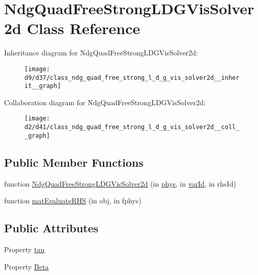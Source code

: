 \hypertarget{class_ndg_quad_free_strong_l_d_g_vis_solver2d}{}\section{Ndg\+Quad\+Free\+Strong\+L\+D\+G\+Vis\+Solver2d Class Reference}
\label{class_ndg_quad_free_strong_l_d_g_vis_solver2d}


Inheritance diagram for Ndg\+Quad\+Free\+Strong\+L\+D\+G\+Vis\+Solver2d\+:
\nopagebreak
\begin{figure}[H]
\begin{center}
\leavevmode
\texttt{[image: d9/d37/class\_ndg\_quad\_free\_strong\_l\_d\_g\_vis\_solver2d\_\_inherit\_\_graph]}
\end{center}
\end{figure}


Collaboration diagram for Ndg\+Quad\+Free\+Strong\+L\+D\+G\+Vis\+Solver2d\+:
\nopagebreak
\begin{figure}[H]
\begin{center}
\leavevmode
\texttt{[image: d2/d41/class\_ndg\_quad\_free\_strong\_l\_d\_g\_vis\_solver2d\_\_coll\_\_graph]}
\end{center}
\end{figure}
\subsection*{Public Member Functions}
\begin{DoxyCompactItemize}
\item 
function \hyperlink{class_ndg_quad_free_strong_l_d_g_vis_solver2d_a495a34183b55abf7f1485f0d4c964ce8}{Ndg\+Quad\+Free\+Strong\+L\+D\+G\+Vis\+Solver2d} (in \hyperlink{class_ndg_abstract_vis_solver_a47663b482747f4136520112484ee2fcd}{phys}, in \hyperlink{class_ndg_abstract_vis_solver_ae28ac2785a59d4c1d8b59e578150a50b}{var\+Id}, in rhs\+Id)
\item 
function \hyperlink{class_ndg_quad_free_strong_l_d_g_vis_solver2d_a830dff480b3f9767f1d655de31578641}{mat\+Evaluate\+R\+HS} (in obj, in fphys)
\end{DoxyCompactItemize}
\subsection*{Public Attributes}
\begin{DoxyCompactItemize}
\item 
Property \hyperlink{class_ndg_quad_free_strong_l_d_g_vis_solver2d_a7359d5677096d6334872b132ac0d5a46}{tau}
\item 
Property \hyperlink{class_ndg_quad_free_strong_l_d_g_vis_solver2d_a635dab058c0835c63ce24bf046910d6c}{Beta}
\end{DoxyCompactItemize}
